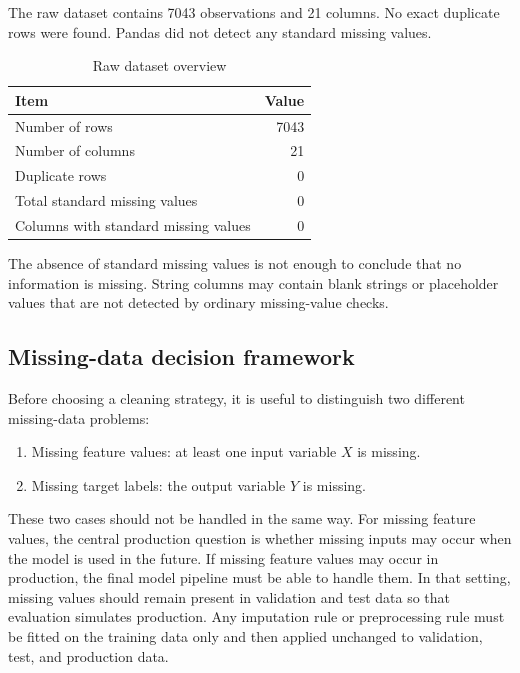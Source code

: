 The raw dataset contains 7043 observations and 21 columns. No exact duplicate rows were found. Pandas did not detect any standard missing values.

\begin{table}[H]
\centering
\caption{Raw dataset overview}
\label{tab:raw-overview}
\begin{tabular}{lr}
\toprule
Item & Value \\
\midrule
Number of rows & 7043 \\
Number of columns & 21 \\
Duplicate rows & 0 \\
Total standard missing values & 0 \\
Columns with standard missing values & 0 \\
\bottomrule
\end{tabular}
\end{table}

The absence of standard missing values is not enough to conclude that no information is missing. String columns may contain blank strings or placeholder values that are not detected by ordinary missing-value checks.

\subsection{Missing-data decision framework}

Before choosing a cleaning strategy, it is useful to distinguish two different missing-data problems:

\begin{enumerate}[leftmargin=*]
    \item Missing feature values: at least one input variable $X$ is missing.
    \item Missing target labels: the output variable $Y$ is missing.
\end{enumerate}

These two cases should not be handled in the same way. For missing feature values, the central production question is whether missing inputs may occur when the model is used in the future. If missing feature values may occur in production, the final model pipeline must be able to handle them. In that setting, missing values should remain present in validation and test data so that evaluation simulates production. Any imputation rule or preprocessing rule must be fitted on the training data only and then applied unchanged to validation, test, and production data.

